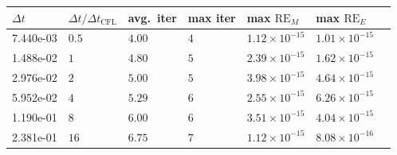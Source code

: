\begin{tabular}{lllllll}
\toprule
$\Delta t$ & $\Delta t/\Delta t_{\mathrm{CFL}}$ & avg.\ iter & max iter & max $\mathrm{RE}_M$ & max $\mathrm{RE}_E$ \\
\midrule
7.440e-03 & \(0.5\) & \(4.00\) & \(4\) & \(1.12\times10^{-15}\) & \(1.01\times10^{-15}\) \\
1.488e-02 & \(1\) & \(4.80\) & \(5\) & \(2.39\times10^{-15}\) & \(1.62\times10^{-15}\) \\
2.976e-02 & \(2\) & \(5.00\) & \(5\) & \(3.98\times10^{-15}\) & \(4.64\times10^{-15}\) \\
5.952e-02 & \(4\) & \(5.29\) & \(6\) & \(2.55\times10^{-15}\) & \(6.26\times10^{-15}\) \\
1.190e-01 & \(8\) & \(6.00\) & \(6\) & \(3.51\times10^{-15}\) & \(4.04\times10^{-15}\) \\
2.381e-01 & \(16\) & \(6.75\) & \(7\) & \(1.12\times10^{-15}\) & \(8.08\times10^{-16}\) \\
\bottomrule
\end{tabular}
